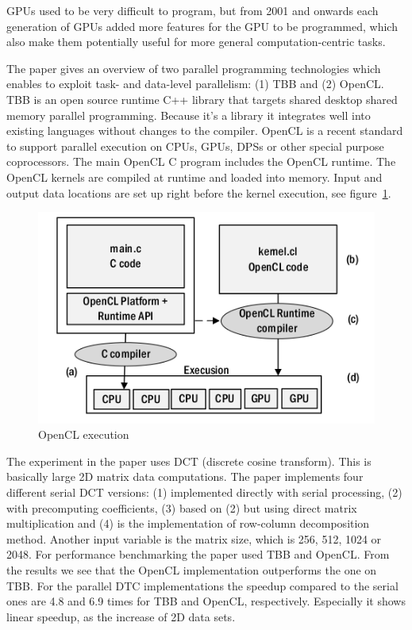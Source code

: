 GPUs used to be very difficult to program, but from 2001 and onwards each
generation of GPUs added more features for the GPU to be programmed, which
also make them potentially useful for more general computation-centric tasks.

The paper gives an overview of two parallel programming technologies which
enables to exploit task- and data-level parallelism: (1) TBB and (2) OpenCL\@.
TBB is an open source runtime C++ library that targets shared desktop shared
memory parallel programming. Because it's a library it integrates well into
existing languages without changes to the compiler. OpenCL is a recent standard
to support parallel execution on CPUs, GPUs, DPSs or other special purpose
coprocessors. The main OpenCL C program includes the OpenCL runtime. The OpenCL
kernels are compiled at runtime  and loaded into memory. Input and output data
locations are set up right before the kernel execution, see
figure~\ref{fig:OpenCL}.

\begin{figure}[!htb]
	\centering
	\includegraphics[scale=0.6]{OpenCL.png}
	\caption{OpenCL execution}
	\label{fig:OpenCL}
\end{figure}

The experiment in the paper uses DCT (discrete cosine transform). This is
basically large 2D matrix data computations. The paper implements four
different serial DCT versions: (1) implemented directly with serial processing,
(2) with precomputing coefficients, (3) based on (2) but using direct matrix
multiplication and (4) is the implementation of row-column decomposition
method. Another input variable is the matrix size, which is 256, 512, 1024 or
2048. For performance benchmarking the paper used TBB and OpenCL\@. From the
results we see that the OpenCL implementation outperforms the one on TBB\@.
For the parallel DTC implementations the speedup compared to the serial ones
are 4.8 and 6.9 times for TBB and OpenCL, respectively. Especially it shows
linear speedup, as the increase of 2D data sets.




